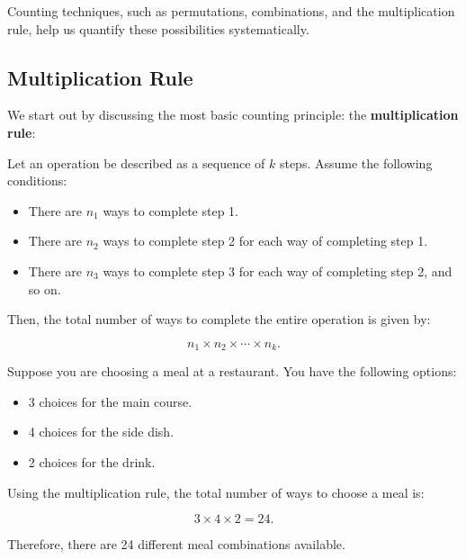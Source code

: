 Counting techniques, such as permutations, combinations, and the multiplication rule, help us quantify these possibilities systematically.

\subsection*{Multiplication Rule}

We start out by discussing the most basic counting principle: the \textbf{multiplication rule}:

\begin{theorem}
    Let an operation be described as a sequence of $k$ steps. Assume the following conditions:
    
    \begin{itemize}
        \item There are $n_1$ ways to complete step 1.
        \item There are $n_2$ ways to complete step 2 for each way of completing step 1.
        \item There are $n_3$ ways to complete step 3 for each way of completing step 2, and so on.
    \end{itemize}
    
    Then, the total number of ways to complete the entire operation is given by:
    
    \[
    n_1 \times n_2 \times \cdots \times n_k.
    \]
\end{theorem}
    
\begin{example}
    Suppose you are choosing a meal at a restaurant. You have the following options:
        
    \begin{itemize}
            \item 3 choices for the main course.
            \item 4 choices for the side dish.
            \item 2 choices for the drink.
    \end{itemize}
        
    Using the multiplication rule, the total number of ways to choose a meal is:
        
    \[
        3 \times 4 \times 2 = 24.
    \]
        
    Therefore, there are 24 different meal combinations available.
\end{example}

